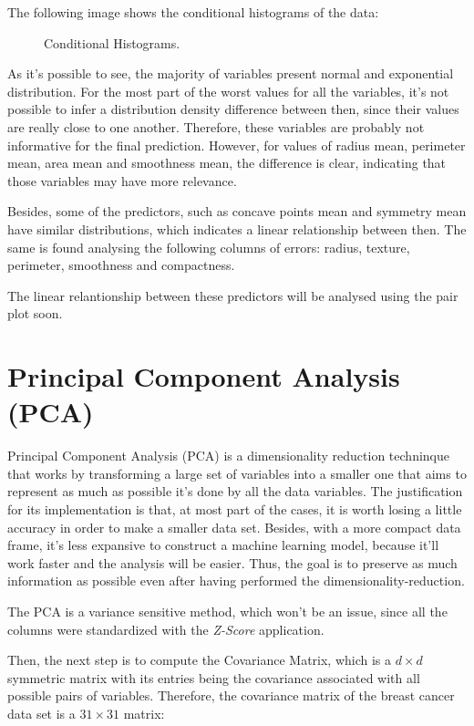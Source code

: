 \documentclass[conference]{IEEEtran}
\begin{document}
The following image shows the conditional histograms of the data:

\begin{figure}[h!]
\caption{Conditional Histograms.}
\label{fig}
\end{figure}

As it's possible to see, the majority of variables present normal and exponential 
distribution. For the most part of the worst values for all the variables, it's not 
possible to infer a distribution density difference between then, since their values 
are really close to one another. Therefore, these variables are probably not 
informative for the final prediction. However, for values of radius mean, perimeter 
mean, area mean and smoothness mean, the difference is clear, indicating that 
those variables may have more relevance. 

Besides, some of the predictors, such as concave points mean and symmetry mean have 
similar distributions, which indicates a linear relationship between then. The same 
is found analysing the following columns of errors: radius, texture, perimeter, 
smoothness and compactness.

The linear relantionship between these predictors will be analysed using the pair 
plot soon.

\section{Principal Component Analysis (PCA)}

Principal Component Analysis (PCA) is a dimensionality reduction techninque that works by transforming a large set of variables into a smaller one that aims to represent as much as possible it's done by all the data variables. The justification for its implementation is that, at most part of the cases, it is worth losing a little accuracy in order to make a smaller data set. Besides, with a more compact data frame, it's less expansive to construct a machine learning model, because it'll work faster and the analysis will be easier. Thus, the goal is to preserve as much information as possible even after having performed the dimensionality-reduction.

The PCA is a variance sensitive method, which won't be an issue, since all the columns were standardized with the \textit{Z-Score} application. 

Then, the next step is to compute the Covariance Matrix, which is a $d \times d$ symmetric matrix with its entries being the covariance associated with all possible pairs of variables. Therefore, the covariance matrix of the breast cancer data set is a $31 \times 31$ matrix: 
\end{document}
